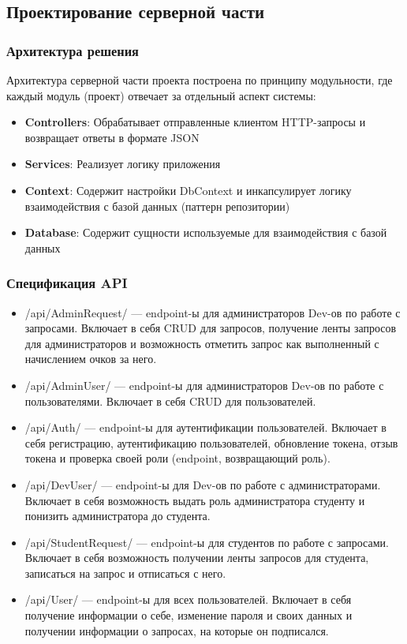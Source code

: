 \subsection{Проектирование серверной части}

\subsubsection{Архитектура решения}

Архитектура серверной части проекта построена по принципу модульности, где каждый модуль (проект) отвечает за отдельный аспект системы:

\begin{itemize}
	\item{\textbf{Controllers}: Обрабатывает отправленные клиентом HTTP-запросы и возвращает ответы в формате JSON}
	\item{\textbf{Services}: Реализует логику приложения}
	\item{\textbf{Context}: Содержит настройки DbContext и инкапсулирует логику взаимодействия с базой данных (паттерн репозитории)}	
	\item{\textbf{Database}: Содержит сущности используемые для взаимодействия с базой данных}
\end{itemize}

\subsubsection{Спецификация API}

\begin{itemize}
	\item{/api/AdminRequest/ --- endpoint-ы для администраторов Dev-ов по работе с запросами. Включает в себя CRUD для запросов, получение ленты запросов для администраторов и возможность отметить запрос как выполненный с начислением очков за него.}
	\item{/api/AdminUser/ --- endpoint-ы для администраторов Dev-ов по работе с пользователями. Включает в себя CRUD для пользователей.}
	\item{/api/Auth/ --- endpoint-ы для аутентификации пользователей. Включает в себя регистрацию, аутентификацию пользователей, обновление токена, отзыв токена и проверка своей роли (endpoint, возвращающий роль).}
	\item{/api/DevUser/ --- endpoint-ы для Dev-ов по работе с администраторами. Включает в себя возможность выдать роль администратора студенту и понизить администратора до студента.}
	\item{/api/StudentRequest/ --- endpoint-ы для студентов по работе с запросами. Включает в себя возможность получении ленты запросов для студента, записаться на запрос и отписаться с него.}
	\item{/api/User/ --- endpoint-ы для всех пользователей. Включает в себя получение информации о себе, изменение пароля и своих данных и получении информации о запросах, на которые он подписался.}
\end{itemize}


